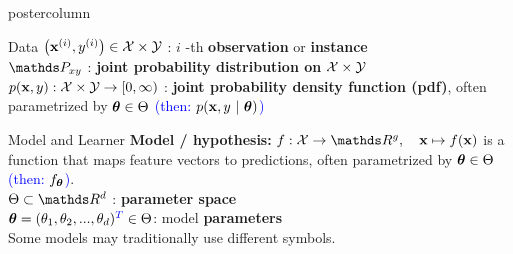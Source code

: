 \documentclass{beamer}
\begin{document}
\begin{frame}[fragile]{}
\begin{columns}
\begin{column}{.31\textwidth}
\begin{beamercolorbox}[center]{postercolumn}
\begin{minipage}{.98\textwidth}
{\begin{myblock}{Data}
$\left(\mathbf{x}^{(i)}, y^{(i)}\right) \in \mathcal{X}\times \mathcal{Y}$ : $i$ -th \textbf{observation} or \textbf{instance} \\
 
$\P_{xy}$ : \textbf{joint probability distribution on} $\mathcal{X} \times \mathcal{Y}$ \\
  
$p(\mathbf{x},y): \mathcal{X} \times \mathcal{Y} \rightarrow [0, \infty)$ : \textbf{joint probability density function (pdf)}, often parametrized by $\bm{\theta} \in \Theta$ \textcolor{blue}{(then: $p(\mathbf{x}, y ~|~ \bm{\theta})$)} \\
\end{myblock}
\begin{myblock}{Model and Learner}
\textbf{Model / \textbf{hypothesis}: }$f : \Xspace \rightarrow \R^g, \quad \xv \mapsto \fx$ is a function that maps feature vectors to predictions, often parametrized by $\bm{\theta} \in \Theta$ \\ \textcolor{blue}{(then: $f_{\bm{\theta}}$)}. \\



$\Theta \subset \R^d$ : \textbf{parameter space} \\
  
$\bm{\theta} = (\theta_1, \theta_2, ..., \theta_d)^{\textcolor{blue}{T}} \in \Theta$: model \textbf{parameters}\\
  \hspace*{1ex}Some models may traditionally use different symbols. \\


\end{myblock}}
\end{minipage}
\end{beamercolorbox}
\end{column}
\end{columns}
\end{frame}
\end{document}
